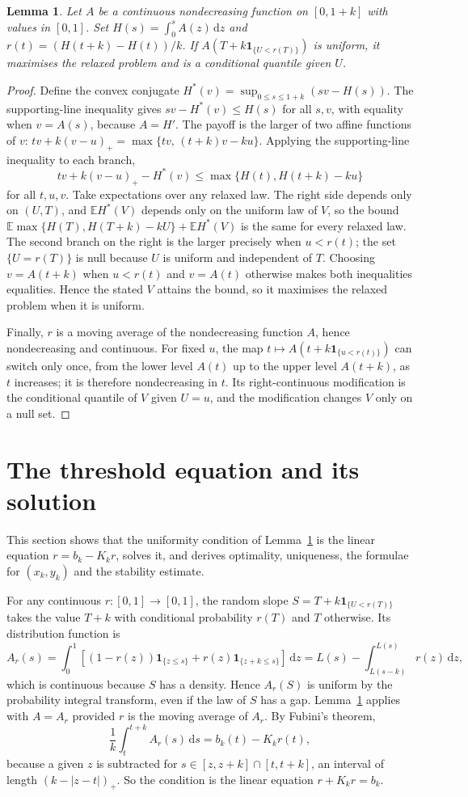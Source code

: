 \documentclass[11pt,a4paper]{article}
\newtheorem{lemma}[theorem]{Lemma}
\theoremstyle{remark}
\newcommand{\E}{\mathbb E}
\newcommand{\1}{\mathbf 1}
\newcommand{\dd}{\,\mathrm d}
\begin{document}
\begin{lemma}\label{dual}
Let $A$ be a continuous nondecreasing function on $[0,1+k]$ with values in $[0,1]$. Set $H(s)=\int_0^s A(z)\dd z$ and $r(t)=(H(t+k)-H(t))/k$. If $A(T+k\1_{\{U<r(T)\}})$ is uniform, it maximises the relaxed problem and is a conditional quantile given $U$.
\end{lemma}
\begin{proof}
Define the convex conjugate $H^*(v)=\sup_{0\le s\le1+k}(sv-H(s))$. The supporting-line inequality gives $sv-H^*(v)\le H(s)$ for all $s,v$, with equality when $v=A(s)$, because $A=H'$. The payoff is the larger of two affine functions of $v$: $tv+k(v-u)_+=\max\{tv,\,(t+k)v-ku\}$. Applying the supporting-line inequality to each branch,
\[
 tv+k(v-u)_+-H^*(v)
 \le \max\{H(t),H(t+k)-ku\}
\]
for all $t,u,v$. Take expectations over any relaxed law. The right side depends only on $(U,T)$, and $\E H^*(V)$ depends only on the uniform law of $V$, so the bound $\E\max\{H(T),H(T+k)-kU\}+\E H^*(V)$ is the same for every relaxed law. The second branch on the right is the larger precisely when $u<r(t)$; the set $\{U=r(T)\}$ is null because $U$ is uniform and independent of $T$. Choosing $v=A(t+k)$ when $u<r(t)$ and $v=A(t)$ otherwise makes both inequalities equalities. Hence the stated $V$ attains the bound, so it maximises the relaxed problem when it is uniform.

Finally, $r$ is a moving average of the nondecreasing function $A$, hence nondecreasing and continuous. For fixed $u$, the map $t\mapsto A(t+k\1_{\{u<r(t)\}})$ can switch only once, from the lower level $A(t)$ up to the upper level $A(t+k)$, as $t$ increases; it is therefore nondecreasing in $t$. Its right-continuous modification is the conditional quantile of $V$ given $U=u$, and the modification changes $V$ only on a null set.
\end{proof}

\section{The threshold equation and its solution}\label{sec:equation}
This section shows that the uniformity condition of Lemma~\ref{dual} is the linear equation $r=b_k-K_kr$, solves it, and derives optimality, uniqueness, the formulae for $(x_k,y_k)$ and the stability estimate.

For any continuous $r:[0,1]\to[0,1]$, the random slope $S=T+k\1_{\{U<r(T)\}}$ takes the value $T+k$ with conditional probability $r(T)$ and $T$ otherwise. Its distribution function is
\[
 A_r(s)=\int_0^1[(1-r(z))\1_{\{z\le s\}}+r(z)\1_{\{z+k\le s\}}]\dd z
       =L(s)-\int_{L(s-k)}^{L(s)}r(z)\dd z,
\]
which is continuous because $S$ has a density. Hence $A_r(S)$ is uniform by the probability integral transform, even if the law of $S$ has a gap. Lemma~\ref{dual} applies with $A=A_r$ provided $r$ is the moving average of $A_r$. By Fubini's theorem,
\[
 \frac1k\int_t^{t+k} A_r(s)\dd s=b_k(t)-K_kr(t),
\]
because a given $z$ is subtracted for $s\in[z,z+k]\cap[t,t+k]$, an interval of length $(k-|z-t|)_+$. So the condition is the linear equation $r+K_kr=b_k$.
\end{document}
